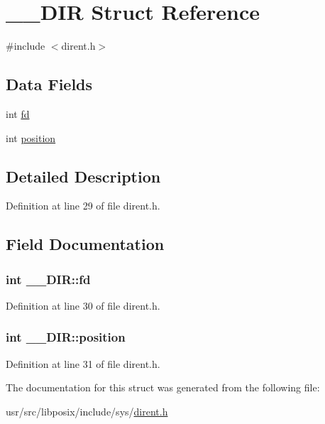 \hypertarget{struct____DIR}{\section{\+\_\+\+\_\+\+D\+I\+R Struct Reference}
\label{struct____DIR}
}


{\ttfamily \#include $<$dirent.\+h$>$}

\subsection*{Data Fields}
\begin{DoxyCompactItemize}
\item 
int \hyperlink{struct____DIR_ae243fc79067063164eb8ec212e6a9e80}{fd}
\item 
int \hyperlink{struct____DIR_adcec35c0ea0ed4342c5425c494554397}{position}
\end{DoxyCompactItemize}


\subsection{Detailed Description}


Definition at line 29 of file dirent.\+h.



\subsection{Field Documentation}
\hypertarget{struct____DIR_ae243fc79067063164eb8ec212e6a9e80}{
\subsubsection[{fd}]{\setlength{\rightskip}{0pt plus 5cm}int \+\_\+\+\_\+\+D\+I\+R\+::fd}}\label{struct____DIR_ae243fc79067063164eb8ec212e6a9e80}


Definition at line 30 of file dirent.\+h.

\hypertarget{struct____DIR_adcec35c0ea0ed4342c5425c494554397}{
\subsubsection[{position}]{\setlength{\rightskip}{0pt plus 5cm}int \+\_\+\+\_\+\+D\+I\+R\+::position}}\label{struct____DIR_adcec35c0ea0ed4342c5425c494554397}


Definition at line 31 of file dirent.\+h.



The documentation for this struct was generated from the following file\+:\begin{DoxyCompactItemize}
\item 
usr/src/libposix/include/sys/\hyperlink{dirent_8h}{dirent.\+h}\end{DoxyCompactItemize}
